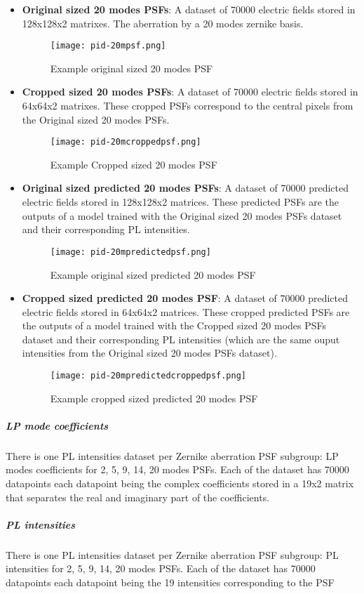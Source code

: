 \begin{itemize}
				\item \textbf{Original sized 20 modes PSFs}: A dataset of 70000 electric fields stored in 128x128x2 matrixes. The aberration by a 20 modes zernike basis.
				\begin{figure*}[ht!]
					\centering
					\texttt{[image: pid-20mpsf.png]}
					\caption{Example original sized 20 modes PSF}\hspace{\fill}
				\end{figure*}				
				\item \textbf{Cropped sized 20 modes PSFs}:  A dataset of 70000 electric fields stored in 64x64x2 matrixes. These cropped  PSFs correspond to the central pixels from the Original sized 20 modes PSFs.
				\begin{figure*}[ht!]
					\centering
					\texttt{[image: pid-20mcroppedpsf.png]}
					\caption{Example Cropped sized 20 modes PSF}\hspace{\fill}
				\end{figure*}			
				\item \textbf{Original sized predicted 20 modes PSFs}:  A dataset of 70000 predicted electric fields stored in 128x128x2 matrices. These predicted PSFs are the outputs of a model trained with the Original sized 20 modes PSFs dataset and their corresponding PL intensities.
				\begin{figure*}[ht!]
					\centering
					\texttt{[image: pid-20mpredictedpsf.png]}
					\caption{Example original sized predicted 20 modes PSF}\hspace{\fill}
				\end{figure*}			
				\item \textbf{Cropped sized predicted 20 modes PSF}: A dataset of 70000 predicted electric fields stored in 64x64x2 matrices. These cropped predicted PSFs are the outputs of a model trained with the Cropped sized 20 modes PSFs dataset and their corresponding PL intensities (which are the same ouput intensities from the Original sized 20 modes PSFs dataset).
				\begin{figure*}[ht!]
					\centering
					\texttt{[image: pid-20mpredictedcroppedpsf.png]}
					\caption{Example cropped sized predicted 20 modes PSF}\hspace{\fill}
				\end{figure*}
				\FloatBarrier
			\end{itemize}
			
		\subparagraph{LP mode coefficients}
			There is one PL intensities dataset per Zernike aberration PSF subgroup: LP modes coefficients for 2, 5, 9, 14, 20 modes PSFs. Each of the dataset has 70000 datapoints each datapoint being the complex coefficients stored in a 19x2 matrix that separates the real and imaginary part of the coefficients.
		\subparagraph{PL intensities}
		
			There is one PL intensities dataset per Zernike aberration PSF subgroup: PL intensities for 2, 5, 9, 14, 20 modes PSFs. Each of the dataset has 70000 datapoints each datapoint being the 19 intensities corresponding to the PSF
			

\finishday